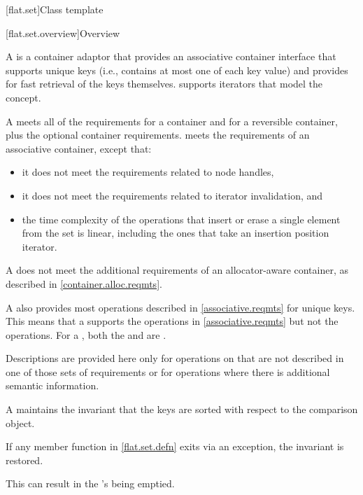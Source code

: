 [flat.set]{Class template }

[flat.set.overview]{Overview}

\pnum
{}%
A  is a container adaptor
that provides an associative container interface
that supports unique keys
(i.e., contains at most one of each key value) and
provides for fast retrieval of the keys themselves.
 supports iterators that model
the  concept.

\pnum
A  meets all of the requirements
for a container and
for a reversible container,
plus the optional container requirements.
 meets the requirements of
an associative container, except that:
\begin{itemize}
\item
it does not meet the requirements
related to node handles,
\item
it does not meet the requirements related to iterator invalidation, and
\item
the time complexity of the operations
that insert or erase a single element from the set
is linear,
including the ones that take an insertion position iterator.
\end{itemize}
\begin{note}
A  does not meet
the additional requirements of an allocator-aware container,
as described in \ref{container.alloc.reqmts}.
\end{note}

\pnum
A  also provides most operations
described in \ref{associative.reqmts} for unique keys.
This means that a  supports
the  operations in \ref{associative.reqmts}
but not the  operations.
For a ,
both the  and  are .

\pnum
Descriptions are provided here only for operations on 
that are not described in one of those sets of requirements or
for operations where there is additional semantic information.

\pnum
A  maintains the invariant that the keys are sorted with
respect to the comparison object.

\pnum
If any member function in \ref{flat.set.defn} exits via an exception,
the invariant is restored.
\begin{note}
This can result in the 's being emptied.
\end{note}

